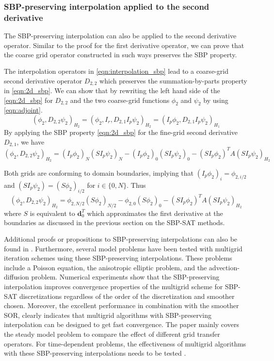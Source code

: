 \subsubsection{SBP-preserving interpolation applied to the second derivative}
The SBP-preserving interpolation can also be applied to the second derivative operator. Similar to the proof for the first derivative operator, we can prove that the coarse grid operator constructed in such ways preserves the SBP property.

The interpolation operators in \autoref{eqn:interpolation_sbp} lead to a coarse-grid second derivative operator $D_{2,2}$ which preserves the summation-by-parts property in \autoref{eqn:2d_sbp}. We can show that by rewriting the left hand side of the \autoref{eqn:2d_sbp} for $D_{2,2}$ and the two coarse-grid functions $\phi_2$ and $\psi_2$ by using \autoref{eqn:adjoint}.
\begin{equation}
    (\phi_2,D_{2,2}\psi_2)_{H_2} = (\phi_2,I_r,D_{2,1}I_p\psi_2)_{H_2} = (I_p\phi_2,D_{2,1}I_p\psi_2)_{H_1}
\end{equation}
By applying the SBP property \autoref{eqn:2d_sbp} for the fine-grid second derivative $D_{2,1}$, we have
\begin{equation}
    (\phi_2,D_{2,2}\psi_2)_{H_2} = (I_p\phi_2)_N(SI_p\psi_2)_N - (I_p\phi_2)_0(SI_p\psi_2)_0 - (SI_p\phi_2)^TA(SI_p\psi_2)_{H_2}
\end{equation}

Both grids are conforming to domain boundaries, implying that $(I_p\phi_2)_i = \phi_{2,i/2}$ and $(SI_p\psi_2) = (S\phi_2)_{i/2}$ for $i\in\{0,N\}$. Thus 
\begin{equation}
     (\phi_2,D_{2,2}\psi_2)_{H_2} = \phi_{2,N/2}(S\phi_2)_{N/2} - \phi_{2,0}(S\phi_2)_0 - (SI_p\phi_2)^TA(SI_p\psi_2)_{H_2}
\end{equation}
where $S$ is equivalent to $\boldsymbol{d}_0^T$ which approximates the first derivative at the boundaries as discussed in the previous section on the SBP-SAT methods.

Additional proofs or propositions to SBP-preserving interpolations can also be found in  \citep{RUGGIU2018216}. Furthermore, several model problems have been tested with multigrid iteration schemes using these SBP-preserving interpolations. These problems include a Poisson equation, the anisotropic elliptic problem, and the advection-diffusion problem. Numerical experiments show that the SBP-preserving interpolation improves convergence properties of the multigrid scheme for SBP-SAT discretizations regardless of the order of the discretization and smoother chosen. Moreover, the excellent performance in combination with the smoother SOR, clearly indicates that multigrid algorithms with SBP-preserving interpolation can be designed to get fast convergence. The paper mainly covers the steady model problem to compare the effect of different grid transfer operators. For time-dependent problems, the effectiveness of multigrid algorithms with these SBP-preserving interpolations needs to be tested \citep{RUGGIU2018216}.


